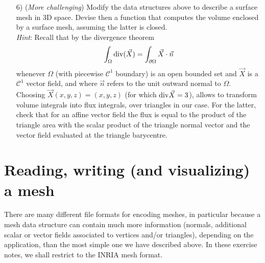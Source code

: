 \documentclass[a4paper,12pt]{article}
\begin{document}
\begin{itemize}
\item[6)] ({\it More challenging}) Modify the data structures above to describe a surface mesh in 3D space. Devise then a function that computes the volume enclosed by a surface mesh, assuming the latter is closed.\\
{\it Hint}: Recall that by the divergence theorem 
$$\int_\Omega {\rm div}( \vec X) = \int_{\partial\Omega} \vec X \cdot \vec n$$
whenever $\Omega$ (with piecewise $\mathcal{C}^1$ boundary) is an open bounded set and
$\vec X$ is a $\mathcal{C}^1$ vector field, and where $\vec n$ refers to the unit outward normal 
to $\Omega.$ Choosing $\vec X(x,y,z) = (x,y,z)$ 
(for which ${\rm div}\vec X = 3$), allows to transform volume integrals into
flux integrals, over triangles in our case. For the latter, check that for an
affine vector field the flux is equal to the product of the triangle area with
the scalar product of the triangle normal vector and the vector field evaluated
at the triangle barycentre.

\end{itemize}

\section{Reading, writing (and visualizing) a mesh}

There are many different file formats for encoding meshes, in particular because a mesh data structure can contain much more information (normals, additional scalar or vector fields associated to vertices and/or triangles), depending on the application, than the most simple one we have described above. In these exercise notes, we shall restrict to the INRIA mesh format.
\end{document}
